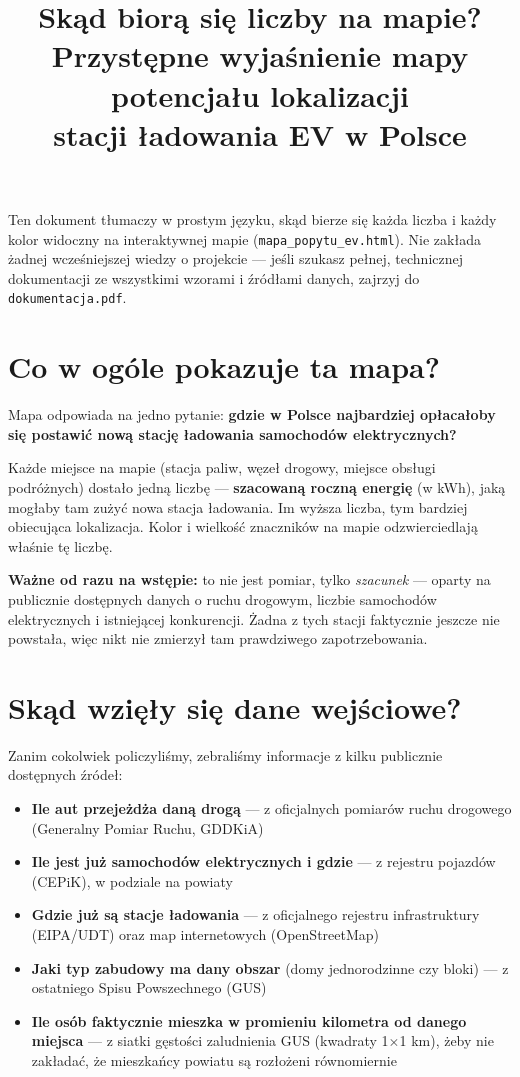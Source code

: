 \documentclass[11pt,a4paper]{article}
\title{\textbf{Skąd biorą się liczby na mapie?}\\
	\large Przystępne wyjaśnienie mapy potencjału lokalizacji\\
	stacji ładowania EV w Polsce}
\author{}
\date{}
\begin{document}
	\maketitle
	\vspace{-1cm}
	\noindent\hrulefill
	\vspace{0.8cm}
	
	Ten dokument tłumaczy w prostym języku, skąd bierze się każda liczba i
	każdy kolor widoczny na interaktywnej mapie (\texttt{mapa\_popytu\_ev.html}).
	Nie zakłada żadnej wcześniejszej wiedzy o projekcie --- jeśli szukasz
	pełnej, technicznej dokumentacji ze wszystkimi wzorami i źródłami danych,
	zajrzyj do \texttt{dokumentacja.pdf}.
	
	\section{Co w ogóle pokazuje ta mapa?}
	
	Mapa odpowiada na jedno pytanie: \textbf{gdzie w Polsce najbardziej
		opłacałoby się postawić nową stację ładowania samochodów elektrycznych?}
	
	Każde miejsce na mapie (stacja paliw, węzeł drogowy, miejsce obsługi
	podróżnych) dostało jedną liczbę --- \textbf{szacowaną roczną energię}
	(w kWh), jaką mogłaby tam zużyć nowa stacja ładowania. Im wyższa liczba,
	tym bardziej obiecująca lokalizacja. Kolor i wielkość znaczników na
	mapie odzwierciedlają właśnie tę liczbę.
	
	\textbf{Ważne od razu na wstępie:} to nie jest pomiar, tylko
	\emph{szacunek} --- oparty na publicznie dostępnych danych o ruchu
	drogowym, liczbie samochodów elektrycznych i istniejącej konkurencji.
	Żadna z tych stacji faktycznie jeszcze nie powstała, więc nikt nie
	zmierzył tam prawdziwego zapotrzebowania.
	
	\section{Skąd wzięły się dane wejściowe?}
	
	Zanim cokolwiek policzyliśmy, zebraliśmy informacje z kilku publicznie
	dostępnych źródeł:
	
	\begin{itemize}[leftmargin=1.2em]
		\item \textbf{Ile aut przejeżdża daną drogą} --- z oficjalnych pomiarów
		ruchu drogowego (Generalny Pomiar Ruchu, GDDKiA)
		\item \textbf{Ile jest już samochodów elektrycznych i gdzie} --- z
		rejestru pojazdów (CEPiK), w podziale na powiaty
		\item \textbf{Gdzie już są stacje ładowania} --- z oficjalnego rejestru
		infrastruktury (EIPA/UDT) oraz map internetowych (OpenStreetMap)
		\item \textbf{Jaki typ zabudowy ma dany obszar} (domy jednorodzinne czy
		bloki) --- z ostatniego Spisu Powszechnego (GUS)
		\item \textbf{Ile osób faktycznie mieszka w promieniu kilometra od
			danego miejsca} --- z siatki gęstości zaludnienia GUS (kwadraty
		1$\times$1 km), żeby nie zakładać, że mieszkańcy powiatu są rozłożeni
		równomiernie
	\end{itemize}
	
\end{document}
